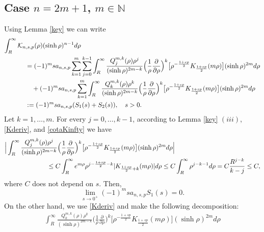\documentclass[a4paper,10pt, reqno]{amsart}
\theoremstyle{definition}
\theoremstyle{remark}
\numberwithin{equation}{section}
\begin{document}
{\subsection{Case $n=2m+1$, $m\in \mathbb N$} Using Lemma \ref{key} we can write
\begin{align}\label{S1S2}
    \int_R^\infty \mathcal K_{n,s,p}(\rho )(\sinh \rho )^{n-1}d\rho&\nonumber\\
    &\hspace{-3cm}=(-1)^msa_{n,s,p}\sum_{k=1}^m\sum_{j=0}^{k-1}\int_R^\infty \frac{Q_j^{m,k}(\rho )\rho ^j}{(\sinh \rho )^{2m-k}}\Big(\frac{1}{\rho }\frac{\partial }{\partial \rho }\Big)^k\big[\rho ^{-\frac{1+sp}{2}}K_{\frac{1+sp}{2}}(m\rho )\big](\sinh \rho )^{2m}d\rho \nonumber\\
    &\hspace{-3cm}\quad +(-1)^msa_{n,s,p}\sum_{k=1}^m\int_R^\infty \frac{Q_k^{m,k}(\rho )\rho ^k}{(\sinh \rho )^{2m-k}}\Big(\frac{1}{\rho }\frac{\partial }{\partial \rho }\Big)^k\big[\rho ^{-\frac{1+sp}{2}}K_{\frac{1+sp}{2}}(m\rho )\big](\sinh \rho )^{2m}d\rho \nonumber\\
    &\hspace{-3cm}:=(-1)^msa_{n,s,p}(S_1(s)+S_2(s)),\quad s>0.
\end{align}
Let $k=1,\ldots, m$. For every $j=0,\ldots, k-1$, according to Lemma \ref{key} $(iii)$, \eqref{Kderiv}, and \eqref{cotaKinfty} we have
\begin{align}\label{sS1}
    \Big|\int_R^\infty \frac{Q_j^{m,k}(\rho )\rho ^j}{(\sinh \rho )^{2m-k}}\Big(\frac{1}{\rho }\frac{\partial }{\partial \rho }\Big)^k\big[\rho ^{-\frac{1+sp}{2}}K_{\frac{1+sp}{2}}(m\rho )\big](\sinh \rho )^{2m}d\rho\Big|&\nonumber\\
    &\hspace{-7cm}\leq C\int_R^\infty e^{m\rho }\rho ^{j-\frac{1+sp}{2}-k}|K_{\frac{1+sp}{2}+k}(m\rho)|d\rho\leq C\int_R^\infty \rho ^{j-k-1}d\rho =C\frac{R^{j-k}}{k-j}\leq C,
\end{align}
where $C$ does not depend on $s$. Then, 
\begin{equation}\label{S1}
\lim_{s\rightarrow 0^+}(-1)^msa_{n,s,p}S_1(s)=0.
\end{equation}
On the other hand, we use \eqref{Kderiv} and make the following decomposition:
\begin{align}\label{Iik}
    \int_R^\infty \frac{Q_k^{m,k}(\rho )\rho ^k}{(\sinh \rho )^{2m-k}}\Big(\frac{1}{\rho }\frac{\partial }{\partial \rho }\Big)^k\big[\rho ^{-\frac{1+sp}{2}}K_{\frac{1+sp}{2}}(m\rho )\big](\sinh \rho )^{2m}d\rho\nonumber\\

\end{align}}
\end{document}
